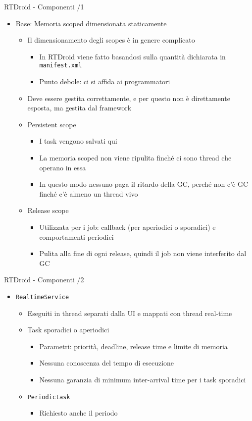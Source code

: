 \begin{frame}{RTDroid - Componenti /1}
	\begin{itemize}
		\item Base: Memoria scoped dimensionata staticamente
		\begin{itemize}
			\item Il dimensionamento degli scopes è in genere complicato
			\begin{itemize}
				\item In RTDroid viene fatto basandosi sulla quantità dichiarata in \texttt{manifest.xml}
				\item Punto debole: ci si affida ai programmatori
			\end{itemize}
			\item Deve essere gestita correttamente, e per questo non è direttamente esposta, ma gestita dal framework
			\item Persistent scope
			\begin{itemize}
				\item I task vengono salvati qui
				\item La memoria scoped non viene ripulita finché ci sono thread che operano in essa
				\item In questo modo nessuno paga il ritardo della GC, perché non c'è GC finché c'è almeno un thread vivo
			\end{itemize}
			\item Release scope
			\begin{itemize}
				\item Utilizzata per i job: callback (per aperiodici o sporadici) e comportamenti periodici
				\item Pulita alla fine di ogni release, quindi il job non viene interferito dal GC
			\end{itemize}
		\end{itemize}
	\end{itemize}
\end{frame}
\begin{frame}{RTDroid - Componenti /2}
	\begin{itemize}
		\item \texttt{RealtimeService}
		\begin{itemize}
			\item Eseguiti in thread separati dalla UI e mappati con thread real-time
			\item Task sporadici o aperiodici
			\begin{itemize}
				\item Parametri: priorità, deadline, release time e limite di memoria
				\item Nessuna conoscenza del tempo di esecuzione
				\item Nessuna garanzia di minimum inter-arrival time per i task sporadici
			\end{itemize}
			\item \texttt{Periodictask}
			\begin{itemize}
				\item Richiesto anche il periodo
			\end{itemize}
		\end{itemize}
	\end{itemize}
\end{frame}
